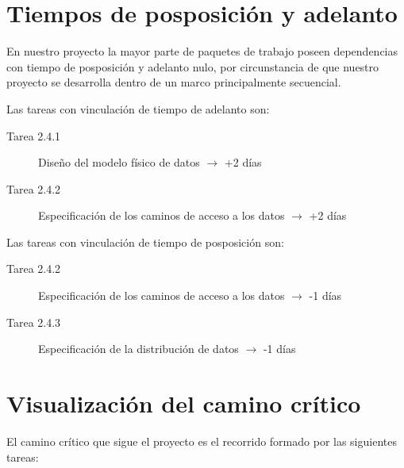 \documentclass[11pt,a4paper,spanish,twoside]{book}
\begin{document}
\section{Tiempos de posposición y adelanto}
En nuestro proyecto la mayor parte de paquetes de trabajo poseen dependencias
con tiempo de posposición y adelanto nulo, por circunstancia de que nuestro
proyecto se desarrolla dentro de un marco principalmente secuencial.

Las tareas con vinculación de tiempo de adelanto son:
\begin{description}
\item[Tarea 2.4.1] Diseño del modelo físico de datos $\to$ +2 días
\item[Tarea 2.4.2] Especificación de los caminos de acceso a los datos $\to$
  +2 días
\end{description}

Las tareas con vinculación de tiempo de posposición son:
\begin{description}
\item[Tarea 2.4.2] Especificación de los caminos de acceso a los datos $\to$
  -1 días
\item[Tarea 2.4.3] Especificación de la distribución de datos $\to$ -1 días
\end{description}

\section{Visualización del camino crítico}
El camino crítico que sigue el proyecto es el recorrido formado por las
siguientes tareas:
\end{document}
